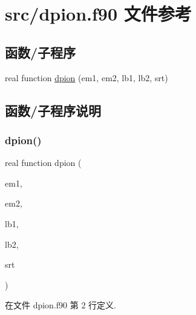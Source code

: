 \hypertarget{dpion_8f90}{}\section{src/dpion.f90 文件参考}
\label{dpion_8f90}
\subsection*{函数/子程序}
\begin{DoxyCompactItemize}
\item 
real function \mbox{\hyperlink{dpion_8f90_a80e35bc38767d9298364ff16bf2d192d}{dpion}} (em1, em2, lb1, lb2, srt)
\end{DoxyCompactItemize}


\subsection{函数/子程序说明}
\mbox{\label{dpion_8f90_a80e35bc38767d9298364ff16bf2d192d}} 
\subsubsection{\texorpdfstring{dpion()}{dpion()}}
{\footnotesize\ttfamily real function dpion (\begin{DoxyParamCaption}\item[{}]{em1,  }\item[{}]{em2,  }\item[{}]{lb1,  }\item[{}]{lb2,  }\item[{}]{srt }\end{DoxyParamCaption})}



在文件 dpion.\+f90 第 2 行定义.

